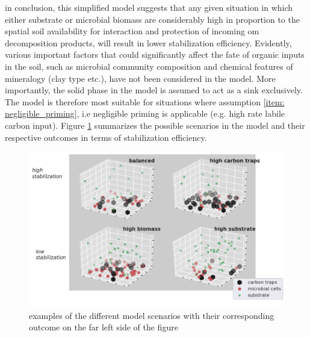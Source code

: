 	 in conclusion, this simplified model suggests that any given situation in which either substrate or microbial biomass are considerably high in proportion to the spatial soil availability for interaction and protection of incoming \gls{om} decomposition products, will result in lower stabilization efficiency. Evidently, various important factors that could significantly affect the fate of organic inputs in the soil, such as microbial community composition and  chemical features of mineralogy (clay type etc.), have not been considered in the model. More importantly, the solid phase in the model is assumed to act as a sink exclusively. The model is therefore most suitable for situations where assumption \ref{item: negligible_priming}, i.e negligible priming is applicable (e.g. high rate labile carbon input). Figure \ref{fig:stabilization_model_scenarios} summarizes the possible scenarios in the model and their respective outcomes in terms of stabilization efficiency.\\

	 \begin{figure}[H]
	 	\centering
	 	\includegraphics[scale=0.8]{thesis_figures/test/model_scenarios.png}
	 	\caption{examples of the different model scenarios with their corresponding outcome on the far left side of the figure}
	 	\label{fig:stabilization_model_scenarios}
	 \end{figure}

